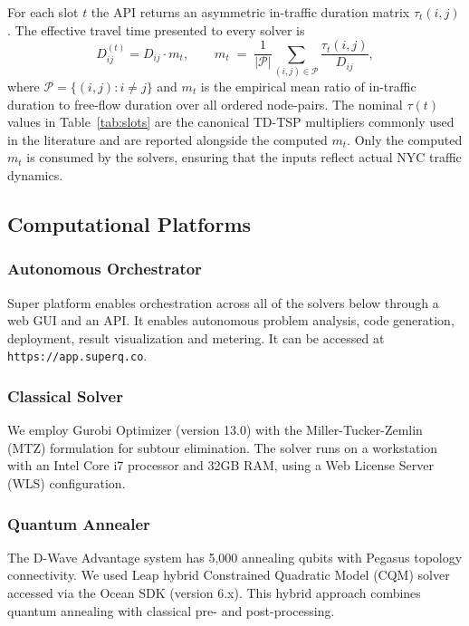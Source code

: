 \documentclass[conference]{IEEEtran}
\begin{document}
For each slot $t$ the API returns an asymmetric in-traffic duration matrix $\tau_t(i,j)$. The effective travel time presented to every solver is
\begin{equation}
D_{ij}^{(t)} = D_{ij} \cdot m_t,
\qquad
m_t \;=\; \frac{1}{|\mathcal{P}|}\!\!\sum_{(i,j) \in \mathcal{P}}
\frac{\tau_t(i,j)}{D_{ij}},
\label{eq:td_distance}
\end{equation}
where $\mathcal{P} = \{(i,j) : i \ne j\}$ and $m_t$ is the empirical mean ratio of in-traffic duration to free-flow duration over all ordered node-pairs. The nominal $\tau(t)$ values in Table~\ref{tab:slots} are the canonical TD-TSP multipliers commonly used in the literature and are reported alongside the computed $m_t$. Only the computed $m_t$ is consumed by the solvers, ensuring that the inputs reflect actual NYC traffic dynamics. 

\subsection{Computational Platforms}

\subsubsection{Autonomous Orchestrator}
Super platform enables orchestration across all of the solvers below through a web GUI and an API. It enables autonomous problem analysis, code generation, deployment, result visualization and metering. It can be accessed at \texttt{https://app.superq.co}.   

\subsubsection{Classical Solver}
We employ Gurobi Optimizer (version 13.0) with the Miller-Tucker-Zemlin (MTZ) formulation for subtour elimination. The solver runs on a workstation with an Intel Core i7 processor and 32GB RAM, using a Web License Server (WLS) configuration.

\subsubsection{Quantum Annealer}
The D-Wave Advantage system has 5,000 annealing qubits with Pegasus topology connectivity. We used Leap hybrid Constrained Quadratic Model (CQM) solver accessed via the Ocean SDK (version 6.x). This hybrid approach combines quantum annealing with classical pre- and post-processing. 
\end{document}
